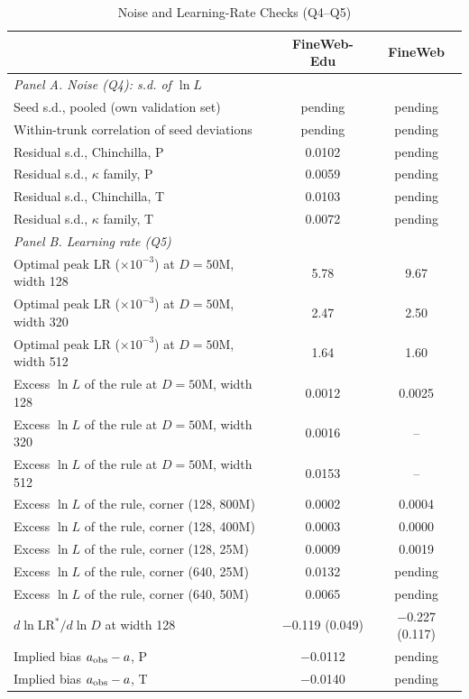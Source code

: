 \begin{table}[tp]
\centering
\caption{Noise and Learning-Rate Checks (Q4--Q5)}
\label{tab:m9-noise-lr}
\footnotesize
\setlength{\tabcolsep}{3pt}
\begin{tabular*}{\textwidth}{@{\extracolsep{\fill}}lcc@{}}
\toprule
& FineWeb-Edu & FineWeb \\
\midrule
\multicolumn{3}{l}{\emph{Panel A. Noise (Q4): s.d. of $\ln L$}} \\
Seed s.d., pooled (own validation set) & pending & pending \\
Within-trunk correlation of seed deviations & pending & pending \\
Residual s.d., Chinchilla, P & 0.0102 & pending \\
Residual s.d., $\kappa$ family, P & 0.0059 & pending \\
Residual s.d., Chinchilla, T & 0.0103 & pending \\
Residual s.d., $\kappa$ family, T & 0.0072 & pending \\
\multicolumn{3}{l}{\emph{Panel B. Learning rate (Q5)}} \\
Optimal peak LR ($\times10^{-3}$) at $D=50$M, width 128 & 5.78 & 9.67 \\
Optimal peak LR ($\times10^{-3}$) at $D=50$M, width 320 & 2.47 & 2.50 \\
Optimal peak LR ($\times10^{-3}$) at $D=50$M, width 512 & 1.64 & 1.60 \\
Excess $\ln L$ of the rule at $D=50$M, width 128 & 0.0012 & 0.0025 \\
Excess $\ln L$ of the rule at $D=50$M, width 320 & 0.0016 & -- \\
Excess $\ln L$ of the rule at $D=50$M, width 512 & 0.0153 & -- \\
Excess $\ln L$ of the rule, corner (128, 800M) & 0.0002 & 0.0004 \\
Excess $\ln L$ of the rule, corner (128, 400M) & 0.0003 & 0.0000 \\
Excess $\ln L$ of the rule, corner (128, 25M) & 0.0009 & 0.0019 \\
Excess $\ln L$ of the rule, corner (640, 25M) & 0.0132 & pending \\
Excess $\ln L$ of the rule, corner (640, 50M) & 0.0065 & pending \\
$d\ln \mathrm{LR}^*/d\ln D$ at width 128 & $-$0.119 (0.049) & $-$0.227 (0.117) \\
Implied bias $a_{\rm obs}-a$, P & $-$0.0112 & pending \\
Implied bias $a_{\rm obs}-a$, T & $-$0.0140 & pending \\
\bottomrule
\end{tabular*}


\end{table}
